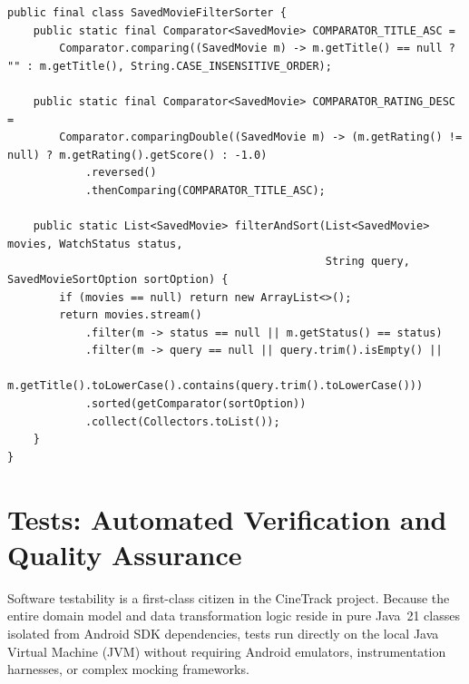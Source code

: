 \documentclass[runningheads,a4paper]{llncs}
\begin{document}
\begin{lstlisting}[style=javastyle,caption={Functional Comparator Implementation (SavedMovieFilterSorter.java)},label={lst:filter-sorter}]
public final class SavedMovieFilterSorter {
    public static final Comparator<SavedMovie> COMPARATOR_TITLE_ASC =
        Comparator.comparing((SavedMovie m) -> m.getTitle() == null ? "" : m.getTitle(), String.CASE_INSENSITIVE_ORDER);

    public static final Comparator<SavedMovie> COMPARATOR_RATING_DESC =
        Comparator.comparingDouble((SavedMovie m) -> (m.getRating() != null) ? m.getRating().getScore() : -1.0)
            .reversed()
            .thenComparing(COMPARATOR_TITLE_ASC);

    public static List<SavedMovie> filterAndSort(List<SavedMovie> movies, WatchStatus status,
                                                 String query, SavedMovieSortOption sortOption) {
        if (movies == null) return new ArrayList<>();
        return movies.stream()
            .filter(m -> status == null || m.getStatus() == status)
            .filter(m -> query == null || query.trim().isEmpty() ||
                         m.getTitle().toLowerCase().contains(query.trim().toLowerCase()))
            .sorted(getComparator(sortOption))
            .collect(Collectors.toList());
    }
}
\end{lstlisting}

\newpage

\section{Tests: Automated Verification and Quality Assurance}

Software testability is a first-class citizen in the CineTrack project. Because the entire domain model and data transformation logic reside in pure Java~21 classes isolated from Android SDK dependencies, tests run directly on the local Java Virtual Machine (JVM) without requiring Android emulators, instrumentation harnesses, or complex mocking frameworks.
\end{document}
